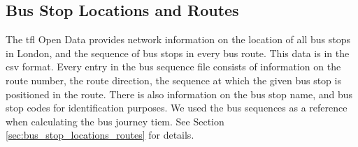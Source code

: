 \subsection{Bus Stop Locations and Routes}
\label{sec:bus_sequence}
\par The \acrshort{tfl} Open Data provides network information on the location of all bus stops in London, and the sequence of bus stops in every bus route. This data is in the \acrfull{csv} format. Every entry in the bus sequence file consists of information on the route number, the route direction, the sequence at which the given bus stop is positioned in the route. There is also information on the bus stop name, and bus stop codes for identification purposes. We used the bus sequences as a reference when calculating the bus journey tiem. See Section \ref{sec:bus_stop_locations_routes} for details.
